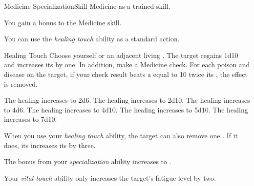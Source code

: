     \begin{feat}{Medicine Specialization}{Skill}
        \featpre Medicine as a trained skill.

         You gain a  bonus to the Medicine skill.

         You can use the \textit{healing touch} ability as a standard action.
        \begin{activeability}{Healing Touch}{}
            \rankline
            Choose yourself or an adjacent living .
            The target regains 1d10 \add {}  and increases its  by one.
            In addition, make a Medicine check.
            For each poison and disease on the target, if your check result beats a  equal to 10 \add twice its , the effect is removed.

            \rankline
             The healing increases to 2d6.
             The healing increases to 2d10.
             The healing increases to 4d6.
             The healing increases to 4d10.
             The healing increases to 5d10.
             The healing increases to 7d10.
        \end{activeability}

         When you use your \textit{healing touch} ability, the target can also remove one .
        If it does, its increases its  by three.

         The bonus from your \textit{specialization} ability increases to .

         Your \textit{vital touch} ability only increases the target's fatigue level by two.
    \end{feat}

